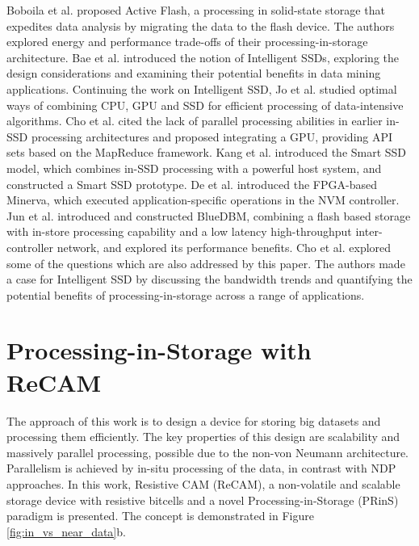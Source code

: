\documentclass{superfri}
\begin{document}
	
	Boboila et al. \cite{boboila2012active} proposed Active Flash, a processing in solid-state storage that expedites data analysis by migrating the data to the flash device. The authors explored energy and performance trade-offs of their processing-in-storage architecture. Bae et al. \cite{bae2013intelligent} introduced the notion of Intelligent SSDs, exploring the design considerations and examining their potential benefits in data mining applications. Continuing the work on Intelligent SSD, Jo et al. \cite{jo2016collaborative} studied optimal ways of combining CPU, GPU and SSD for efficient processing of data-intensive algorithms. Cho et al. \cite{cho2013xsd} cited the lack of parallel processing abilities in earlier in-SSD processing architectures and proposed integrating a GPU, providing API sets based on the MapReduce framework. Kang et al. \cite{kang2013enabling} introduced the Smart SSD model, which combines in-SSD processing with a powerful host system, and constructed a Smart SSD prototype. De et al. \cite{de2013minerva} introduced the FPGA-based Minerva, which executed application-specific operations in the NVM controller. Jun et al. \cite{jun2015bluedbm} introduced and constructed BlueDBM, combining a flash based storage with in-store processing capability and a low latency high-throughput inter-controller network, and explored its performance benefits. Cho et al. \cite{cho2013active} explored some of the questions which are also addressed by this paper. The authors made a case for Intelligent SSD by discussing the bandwidth trends and quantifying the potential benefits of processing-in-storage across a range of applications.
	
	
	\section{Processing-in-Storage with ReCAM}
	\label{sec:PRinS_with_ReCAM}
	
	The approach of this work is to design a device for storing big datasets and processing them efficiently. The key properties of this design are scalability and massively parallel processing, possible due to the non-von Neumann architecture. Parallelism is achieved by in-situ processing of the data, in contrast with NDP approaches. In this work, Resistive CAM (ReCAM), a non-volatile and scalable storage device with resistive bitcells and a novel Processing-in-Storage (PRinS) paradigm is presented. The concept is demonstrated in Figure \ref{fig:in_vs_near_data}b.
	
\end{document}
